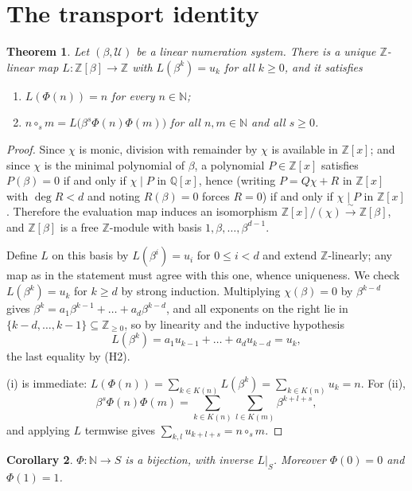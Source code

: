\documentclass[11pt,reqno]{amsart}
\theoremstyle{plain}
\newtheorem{theorem}{Theorem}[section]
\newtheorem{corollary}[theorem]{Corollary}
\theoremstyle{definition}
\newcommand{\Z}{\mathbb{Z}}
\newcommand{\N}{\mathbb{N}}
\newcommand{\Q}{\mathbb{Q}}
\newcommand{\Uu}{\mathcal{U}}
\begin{document}
\section{The transport identity}

\begin{theorem}\label{thm:transport}
Let $(\beta,\Uu)$ be a linear numeration system. There is a unique $\Z$-linear map
$L\colon\Z[\beta]\to\Z$ with $L(\beta^{k})=u_{k}$ for all $k\ge0$, and it satisfies
\begin{enumerate}
\item[(i)] $L(\Phi(n))=n$ for every $n\in\N$;
\item[(ii)] $n\circ_{s}m=L\bigl(\beta^{s}\Phi(n)\Phi(m)\bigr)$ for all $n,m\in\N$ and all $s\ge0$.
\end{enumerate}
\end{theorem}

\begin{proof}
Since $\chi$ is monic, division with remainder by $\chi$ is available in $\Z[x]$; and since $\chi$ is
the minimal polynomial of $\beta$, a polynomial $P\in\Z[x]$ satisfies $P(\beta)=0$ if and only if
$\chi\mid P$ in $\Q[x]$, hence (writing $P=Q\chi+R$ in $\Z[x]$ with $\deg R<d$ and noting $R(\beta)=0$
forces $R=0$) if and only if $\chi\mid P$ in $\Z[x]$. Therefore the evaluation map induces an
isomorphism $\Z[x]/(\chi)\xrightarrow{\ \sim\ }\Z[\beta]$, and $\Z[\beta]$ is a free $\Z$-module with
basis $1,\beta,\dots,\beta^{d-1}$.

Define $L$ on this basis by $L(\beta^{i})=u_{i}$ for $0\le i<d$ and extend $\Z$-linearly; any map as
in the statement must agree with this one, whence uniqueness. We check $L(\beta^{k})=u_{k}$ for
$k\ge d$ by strong induction. Multiplying $\chi(\beta)=0$ by $\beta^{k-d}$ gives
$\beta^{k}=a_{1}\beta^{k-1}+\dots+a_{d}\beta^{k-d}$, and all exponents on the right lie in
$\{k-d,\dots,k-1\}\subseteq\Z_{\ge0}$, so by linearity and the inductive hypothesis
\[
  L(\beta^{k})=a_{1}u_{k-1}+\dots+a_{d}u_{k-d}=u_{k},
\]
the last equality by (H2).

(i) is immediate: $L(\Phi(n))=\sum_{k\in K(n)}L(\beta^{k})=\sum_{k\in K(n)}u_{k}=n$. For (ii),
\[
  \beta^{s}\Phi(n)\Phi(m)=\sum_{k\in K(n)}\sum_{l\in K(m)}\beta^{k+l+s},
\]
and applying $L$ termwise gives $\sum_{k,l}u_{k+l+s}=n\circ_{s}m$.
\end{proof}

\begin{corollary}\label{cor:bijection}
$\Phi\colon\N\to S$ is a bijection, with inverse $L|_{S}$. Moreover $\Phi(0)=0$ and $\Phi(1)=1$.
\end{corollary}
\end{document}
